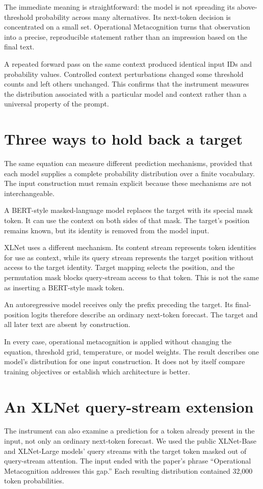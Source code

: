 \documentclass[11pt,a4paper]{article}
\begin{document}
The immediate meaning is straightforward: the model is not spreading its above-threshold probability across many alternatives. Its next-token decision is concentrated on a small set. Operational Metacognition turns that observation into a precise, reproducible statement rather than an impression based on the final text.

A repeated forward pass on the same context produced identical input IDs and probability values. Controlled context perturbations changed some threshold counts and left others unchanged. This confirms that the instrument measures the distribution associated with a particular model and context rather than a universal property of the prompt.

\section{Three ways to hold back a target}
The same equation can measure different prediction mechanisms, provided that each model supplies a complete probability distribution over a finite vocabulary. The input construction must remain explicit because these mechanisms are not interchangeable.

A BERT-style masked-language model replaces the target with its special mask token. It can use the context on both sides of that mask. The target's position remains known, but its identity is removed from the model input.

XLNet uses a different mechanism. Its content stream represents token identities for use as context, while its query stream represents the target position without access to the target identity. Target mapping selects the position, and the permutation mask blocks query-stream access to that token. This is not the same as inserting a BERT-style mask token.

An autoregressive model receives only the prefix preceding the target. Its final-position logits therefore describe an ordinary next-token forecast. The target and all later text are absent by construction.

In every case, operational metacognition is applied without changing the equation, threshold grid, temperature, or model weights. The result describes one model's distribution for one input construction. It does not by itself compare training objectives or establish which architecture is better.

\section{An XLNet query-stream extension}
The instrument can also examine a prediction for a token already present in the input, not only an ordinary next-token forecast. We used the public XLNet-Base and XLNet-Large models' query streams with the target token masked out of query-stream attention. The input ended with the paper's phrase ``Operational Metacognition addresses this gap.'' Each resulting distribution contained 32,000 token probabilities.
\end{document}
